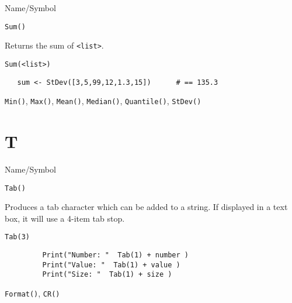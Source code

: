 \rl





\begin{desc}{Name/Symbol}
\item[Name/Symbol]  	\verb+Sum()+ 

\item[Description]  Returns the sum  of \verb+<list>+.

\item[Usage]       	
\begin{verbatim}
Sum(<list>)        
\end{verbatim}

\item[Example]	
\begin{verbatim}
   sum <- StDev([3,5,99,12,1.3,15])      # == 135.3
\end{verbatim}

\item[See Also]     	\verb+Min()+, \verb+Max()+, \verb+Mean()+, \verb+Median()+, \verb+Quantile()+, \verb+StDev()+
\end{desc}

\rl

\section{T}
\rl


\begin{desc}{Name/Symbol}

\item[Name/Symbol] \verb+Tab()+

\item[Description]  Produces a tab character which can be added to a
  string. If displayed in a text box, it will use a 4-item tab stop.

\item[Usage]        \verb!Tab(3)!


\item[Example]     
\begin{verbatim}
         Print("Number: "  Tab(1) + number )
         Print("Value: "  Tab(1) + value )
         Print("Size: "  Tab(1) + size )
\end{verbatim}
\item[See Also]
\verb+Format()+, \verb+CR()+
\end{desc}

\rl     

